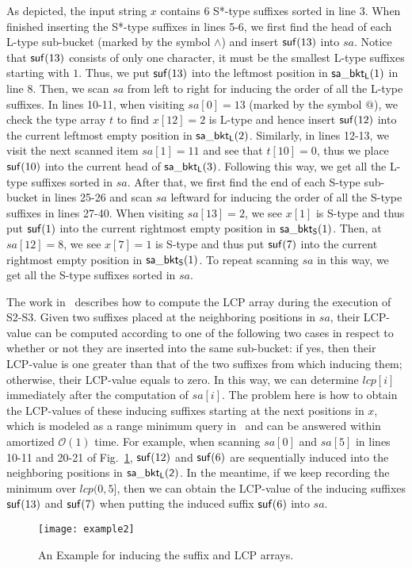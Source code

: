 \documentclass[10pt,journal,compsoc]{IEEEtran}
\begin{document}
As depicted, the input string $x$ contains 6 S*-type suffixes sorted in line 3. When finished inserting the S*-type suffixes in lines 5-6, we first find the head of each L-type sub-bucket (marked by the symbol $\wedge$) and insert ${\sf suf}(13)$ into $sa$. Notice that ${\sf suf}(13)$ consists of only one character, it must be the smallest L-type suffixes starting with $1$. Thus, we put ${\sf suf}(13)$ into the leftmost position in ${\sf sa\_bkt_L}(1)$ in line 8. Then, we scan $sa$ from left to right for inducing the order of all the L-type suffixes. In lines 10-11, when visiting $sa[0] = 13$ (marked by the symbol $@$), we check the type array $t$ to find $x[12] = 2$ is L-type and hence insert ${\sf suf}(12)$ into the current leftmost empty position in ${\sf sa\_bkt_L}(2)$. Similarly, in lines 12-13, we visit the next scanned item $sa[1] = 11$ and see that $t[10] = 0$, thus we place ${\sf suf}(10)$ into the current head of ${\sf sa\_bkt_L}(3)$. Following this way, we get all the L-type suffixes sorted in $sa$. After that, we first find the end of each S-type sub-bucket in lines 25-26 and scan $sa$ leftward for inducing the order of all the S-type suffixes in lines 27-40. When visiting $sa[13] = 2$, we see $x[1]$ is S-type and thus put ${\sf suf}(1)$ into the current rightmost empty position in ${\sf sa\_bkt_S}(1)$. Then, at $sa[12] = 8$, we see $x[7] = 1$ is S-type and thus put ${\sf suf}(7)$ into the current rightmost empty position in ${\sf sa\_bkt_S}(1)$. To repeat scanning $sa$ in this way, we get all the S-type suffixes sorted in $sa$. 

The work in~\cite{Fischer11} describes how to compute the LCP array during the execution of S2-S3. Given two suffixes placed at the neighboring positions in $sa$, their LCP-value can be computed according to one of the following two cases in respect to whether or not they are inserted into the same sub-bucket: if yes, then their LCP-value is one greater than that of the two suffixes from which inducing them; otherwise, their LCP-value equals to zero. In this way, we can determine $lcp[i]$ immediately after the computation of $sa[i]$. The problem here is how to obtain the LCP-values of these inducing suffixes starting at the next positions in $x$, which is modeled as a range minimum query in~\cite{Fischer11} and can be answered within amortized $\mathcal{O}(1)$ time. For example, when scanning $sa[0]$ and $sa[5]$ in lines 10-11 and 20-21 of Fig.~\ref{fig:example2}, ${\sf suf}(12)$ and ${\sf suf}(6)$ are sequentially induced into the neighboring positions in ${\sf sa\_bkt_L(2)}$. In the meantime, if we keep recording the minimum over $lcp(0, 5]$, then we can obtain the LCP-value of the inducing suffixes ${\sf suf}(13)$ and ${\sf suf}(7)$ when putting the induced suffix ${\sf suf}(6)$ into $sa$.

\begin{figure}
	\centering
	\texttt{[image: example2]}

	\caption{An Example for inducing the suffix and LCP arrays. \label{fig:example2}}	
\end{figure}
 
	
\end{document}
